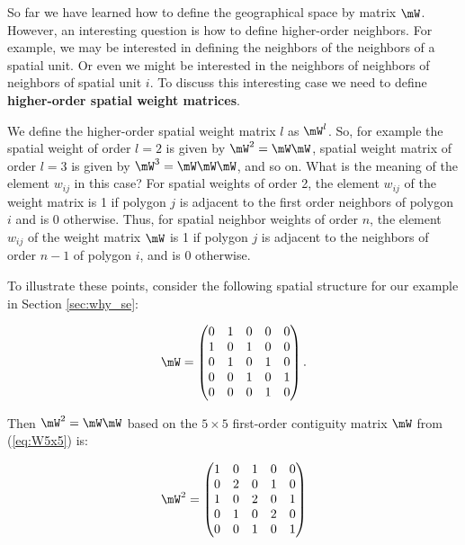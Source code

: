 \documentclass[english,12pt]{book}\usepackage[]{graphicx}\usepackage[]{xcolor}
\begin{document}
So far we have learned how to define the geographical space by matrix $\mW$. However, an interesting question is how to define higher-order neighbors. For example, we may be interested in defining the neighbors of the neighbors of a spatial unit. Or even we might be interested in the neighbors of neighbors of neighbors of spatial unit $i$. To discuss this interesting case we need to define \textbf{higher-order spatial weight matrices}. 

We define the higher-order spatial weight matrix $l$ as $\mW^l$. So, for example the spatial weight of order $l=2$ is given by $\mW^2 = \mW\mW$, spatial weight matrix of order $l = 3$ is given by $\mW^3 = \mW\mW\mW$, and so on. What is the meaning of the element $w_{ij}$ in this case? For spatial weights of order 2, the element $w_{ij}$ of the weight matrix is 1 if polygon $j$ is adjacent to the first order neighbors of polygon $i$ and is 0 otherwise. Thus, for spatial neighbor weights of order $n$, the element $w_{ij}$ of the weight matrix $\mW$ is 1 if polygon $j$ is adjacent to the neighbors of order $n-1$ of polygon $i$, and is 0 otherwise. 

To illustrate these points, consider the following spatial structure for our example in Section \ref{sec:why_se}:

\begin{equation}\label{eq:W5x5}
\mW = \begin{pmatrix}
      0 & 1 & 0 & 0 & 0 \\
      1 & 0 & 1 & 0 & 0 \\
      0 & 1 & 0 & 1 & 0 \\
      0 & 0 & 1 & 0 & 1 \\
      0 & 0 & 0 & 1 & 0
      \end{pmatrix}.
\end{equation}

Then $\mW^2 = \mW\mW$ based on the $5\times 5$ first-order contiguity matrix $\mW$ from (\ref{eq:W5x5}) is:

\begin{equation}
\mW^2 = \begin{pmatrix}\label{eq:W25x5}
      1 & 0 & 1 & 0 & 0 \\
      0 & 2 & 0 & 1 & 0 \\
      1 & 0 & 2 & 0 & 1 \\
      0 & 1 & 0 & 2 & 0 \\
      0 & 0 & 1 & 0 & 1
      \end{pmatrix}
\end{equation}
\end{document}
